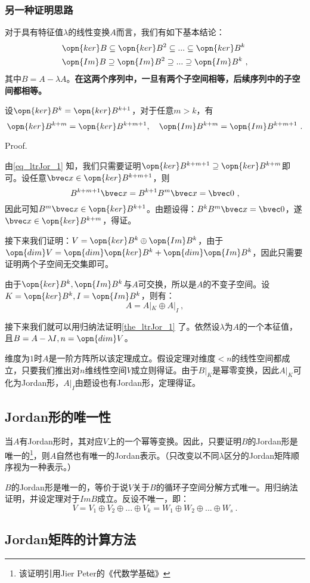 \subsubsection{另一种证明思路}
对于具有特征值$\lambda$的线性变换$A$而言，我们有如下基本结论：
\begin{equation}\label{eq_ltrJor_1}
\begin{aligned}
&\opn{ker}B\subseteq\opn{ker}B^2\subseteq...\subseteq\opn{ker}B^k\\
&\opn{Im}B\supseteq\opn{Im}B^2\supseteq...\supseteq\opn{Im}B^k~,
\end{aligned}
\end{equation}
其中$B=A-\lambda A$。\textbf{在这两个序列中，一旦有两个子空间相等，后续序列中的子空间都相等。}
\begin{lemma}{}
设$\opn{ker}B^k=\opn{ker}B^{k+1}$，对于任意$m>k$，有\begin{equation}
\opn{ker}B^{k+m}=\opn{ker}B^{k+m+1},\quad\opn{Im}B^{k+m}=\opn{Im}B^{k+m+1}~.
\end{equation}
\end{lemma}
Proof.

由\autoref{eq_ltrJor_1} 知，我们只需要证明$\opn{ker}B^{k+m+1}\supseteq \opn{ker}B^{k+m}$即可。设任意$\bvec x\in \opn{ker}B^{k+m+1}$，则
\begin{equation}
B^{k+m+1}\bvec x=B^{k+1}B^m\bvec x=\bvec 0~,
\end{equation}
因此可知$B^m\bvec x\in\opn{ker}B^{k+1}$。由题设得：$B^{k}B^m\bvec x=\bvec 0$，遂$\bvec x\in\opn{ker}B^{k+m}$，得证。

接下来我们证明：$V=\opn{ker}B^k\oplus\opn{Im}B^k$，由于$\opn{dim}V=\opn{dim}\opn{ker}B^k+\opn{dim}\opn{Im}B^k$，因此只需要证明两个子空间无交集即可。

由于$\opn{ker}B^k,\opn{Im}B^k$与$A$可交换，所以是$A$的不变子空间。设$K=\opn{ker}B^k,I=\opn{Im}B^k$，则有：
\begin{equation}
A=A|_K\oplus A|_I~,
\end{equation}

接下来我们就可以用归纳法证明\autoref{the_ltrJor_1} 了。依然设$\lambda$为$A$的一个本征值，且$B=A-\lambda I,n=\opn{dim}V$。

维度为$1$时$A$是一阶方阵所以该定理成立。假设定理对维度$<n$的线性空间都成立，只要我们推出对$n$维线性空间$V$成立则得证。由于$B|_K$是幂零变换，因此$A|_K$可化为Jordan形，$A|_I$由题设也有Jordan形，定理得证。
\subsection{Jordan形的唯一性}
当$A$有Jordan形时，其对应$V$上的一个幂等变换。因此，只要证明$B$的Jordan形是唯一的\footnote{该证明引用Jier Peter的《代数学基础》}，则$A$自然也有唯一的Jordan表示。（只改变以不同$\lambda$区分的Jordan矩阵顺序视为一种表示。）

$B$的Jordan形是唯一的，等价于说$V$关于$B$的循环子空间分解方式唯一。用归纳法证明，并设定理对于$Im B$成立。反设不唯一，即：
\begin{equation}
V=V_1\oplus V_2\oplus...\oplus V_k=W_1\oplus W_2\oplus...\oplus W_s~.
\end{equation}

\subsection{Jordan矩阵的计算方法}